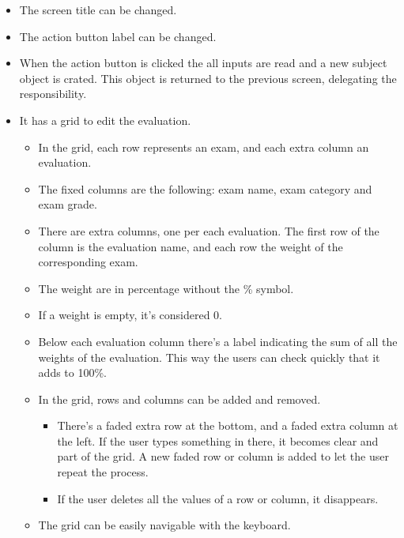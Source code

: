 \begin{itemize}[leftmargin=2cm]
    \item[\nextTask{}\label{req:x}] The screen title can be changed.
    \item[\nextTask{}\label{req:x}] The action button label can be changed.
    \item[\nextTask{}\label{req:x}] When the action button is clicked the all inputs are read and a new subject object is crated. This object is returned to the previous screen, delegating the responsibility.
    \item[\nextTask{}\label{req:x}] It has a grid to edit the evaluation.
    \begin{itemize}[leftmargin=2cm]
        \item[\nextTask{}\label{req:x}] In the grid, each row represents an exam, and each extra column an evaluation.
        \item[\nextTask{}\label{req:x}] The fixed columns are the following: exam name, exam category and exam grade.
        \item[\nextTask{}\label{req:x}] There are extra columns, one per each evaluation. The first row of the column is the evaluation name, and each row the weight of the corresponding exam.
        \item[\nextTask{}\label{req:x}] The weight are in percentage without the \% symbol.
        \item[\nextTask{}\label{req:x}] If a weight is empty, it's considered 0.
        \item[\nextTask{}\label{req:x}] Below each evaluation column there's a label indicating the sum of all the weights of the evaluation. This way the users can check quickly that it adds to 100\%.
        \item[\nextTask{}\label{req:x}] In the grid, rows and columns can be added and removed.
        \begin{itemize}[leftmargin=2cm]
            \item[\nextTask{}\label{req:x}] There's a faded extra row at the bottom, and a faded extra column at the left. If the user types something in there, it becomes clear and part of the grid. A new faded row or column is added to let the user repeat the process.
            \item[\nextTask{}\label{req:x}] If the user deletes all the values of a row or column, it disappears.
        \end{itemize}
        \item[\nextTask{}\label{req:x}] The grid can be easily navigable with the keyboard.

\end{itemize}
\end{itemize}
